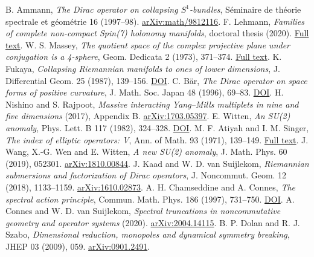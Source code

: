 \documentclass[11pt,oneside]{article}
\newcommand{\paperlink}[2]{\href{#1}{#2}}
\begin{document}
\begin{thebibliography}{99}\small
{} B. Ammann, \emph{The Dirac operator on collapsing \(S^1\)-bundles}, S\'eminaire de th\'eorie spectrale et g\'eom\'etrie 16 (1997--98). \paperlink{https://arxiv.org/abs/math/9812116}{arXiv:math/9812116}.
 F. Lehmann, \emph{Families of complete non-compact Spin(7) holonomy manifolds}, doctoral thesis (2020). \paperlink{https://people.maths.ox.ac.uk/lotay/Lehmann\%20PhD\%20Thesis.pdf}{Full text}.
 W. S. Massey, \emph{The quotient space of the complex projective plane under conjugation is a 4-sphere}, Geom. Dedicata 2 (1973), 371--374. \paperlink{https://www.maths.ed.ac.uk/~v1ranick/papers/massey5.pdf}{Full text}.
 K. Fukaya, \emph{Collapsing Riemannian manifolds to ones of lower dimensions}, J. Differential Geom. 25 (1987), 139--156. \paperlink{https://doi.org/10.4310/jdg/1214440728}{DOI}.
 C. B\"ar, \emph{The Dirac operator on space forms of positive curvature}, J. Math. Soc. Japan 48 (1996), 69--83. \paperlink{https://doi.org/10.2969/jmsj/04810069}{DOI}.
 H. Nishino and S. Rajpoot, \emph{Massive interacting Yang--Mills multiplets in nine and five dimensions} (2017), Appendix B. \paperlink{https://arxiv.org/abs/1703.05397}{arXiv:1703.05397}.
 E. Witten, \emph{An SU(2) anomaly}, Phys. Lett. B 117 (1982), 324--328. \paperlink{https://doi.org/10.1016/0370-2693(82)90728-6}{DOI}.
 M. F. Atiyah and I. M. Singer, \emph{The index of elliptic operators: V}, Ann. of Math. 93 (1971), 139--149. \paperlink{https://webhomes.maths.ed.ac.uk/~v1ranick/papers/as5.pdf}{Full text}.
 J. Wang, X.-G. Wen and E. Witten, \emph{A new SU(2) anomaly}, J. Math. Phys. 60 (2019), 052301. \paperlink{https://arxiv.org/abs/1810.00844}{arXiv:1810.00844}.
 J. Kaad and W. D. van Suijlekom, \emph{Riemannian submersions and factorization of Dirac operators}, J. Noncommut. Geom. 12 (2018), 1133--1159. \paperlink{https://arxiv.org/abs/1610.02873}{arXiv:1610.02873}.
 A. H. Chamseddine and A. Connes, \emph{The spectral action principle}, Commun. Math. Phys. 186 (1997), 731--750. \paperlink{https://doi.org/10.1007/s002200050126}{DOI}.
 A. Connes and W. D. van Suijlekom, \emph{Spectral truncations in noncommutative geometry and operator systems} (2020). \paperlink{https://arxiv.org/abs/2004.14115}{arXiv:2004.14115}.
 B. P. Dolan and R. J. Szabo, \emph{Dimensional reduction, monopoles and dynamical symmetry breaking}, JHEP 03 (2009), 059. \paperlink{https://arxiv.org/abs/0901.2491}{arXiv:0901.2491}.

\end{thebibliography}
\end{document}
